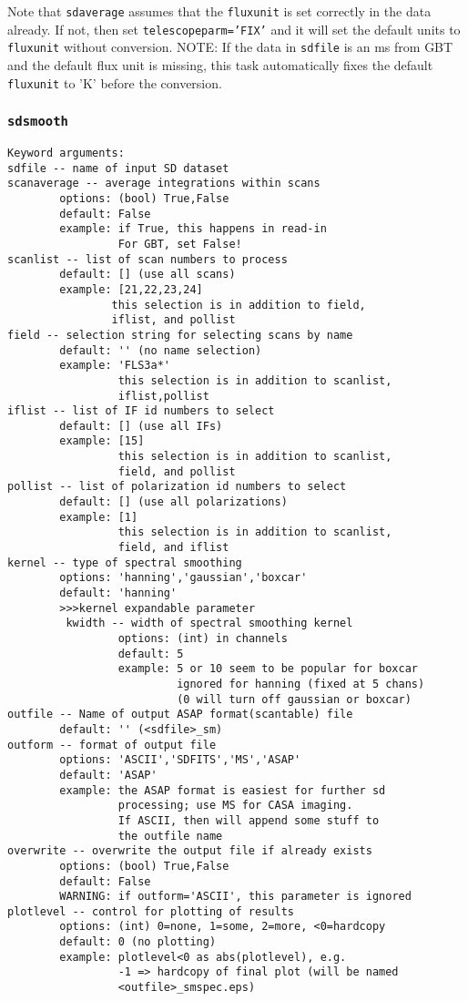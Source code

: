   Note that {\tt sdaverage} assumes that the {\tt fluxunit} is set correctly in
  the data already.  If not, then set {\tt telescopeparm='FIX'} and it
  will set the default units to {\tt fluxunit} without conversion.
  NOTE: If the data in {\tt sdfile} is an ms from GBT and the default flux
  unit is missing, this task automatically fixes the default {\tt fluxunit}
  to 'K' before the conversion.

\subsubsection{{\tt sdsmooth}}
\label{section:sd.sdtasks.tasks.sdsmooth}

\begin{verbatim}
Keyword arguments:
sdfile -- name of input SD dataset
scanaverage -- average integrations within scans
        options: (bool) True,False
        default: False
        example: if True, this happens in read-in
                 For GBT, set False!
scanlist -- list of scan numbers to process
        default: [] (use all scans)
        example: [21,22,23,24]
                this selection is in addition to field,
                iflist, and pollist
field -- selection string for selecting scans by name
        default: '' (no name selection)
        example: 'FLS3a*'
                 this selection is in addition to scanlist,
                 iflist,pollist
iflist -- list of IF id numbers to select
        default: [] (use all IFs)
        example: [15]
                 this selection is in addition to scanlist,
                 field, and pollist
pollist -- list of polarization id numbers to select
        default: [] (use all polarizations)
        example: [1]
                 this selection is in addition to scanlist,
                 field, and iflist
kernel -- type of spectral smoothing
        options: 'hanning','gaussian','boxcar'
        default: 'hanning'
        >>>kernel expandable parameter
         kwidth -- width of spectral smoothing kernel
                 options: (int) in channels
                 default: 5
                 example: 5 or 10 seem to be popular for boxcar
                          ignored for hanning (fixed at 5 chans)
                          (0 will turn off gaussian or boxcar)
outfile -- Name of output ASAP format(scantable) file
        default: '' (<sdfile>_sm)
outform -- format of output file
        options: 'ASCII','SDFITS','MS','ASAP'
        default: 'ASAP'
        example: the ASAP format is easiest for further sd
                 processing; use MS for CASA imaging.
                 If ASCII, then will append some stuff to
                 the outfile name
overwrite -- overwrite the output file if already exists
        options: (bool) True,False
        default: False
        WARNING: if outform='ASCII', this parameter is ignored
plotlevel -- control for plotting of results
        options: (int) 0=none, 1=some, 2=more, <0=hardcopy
        default: 0 (no plotting)
        example: plotlevel<0 as abs(plotlevel), e.g.
                 -1 => hardcopy of final plot (will be named
                 <outfile>_smspec.eps)
\end{verbatim}

